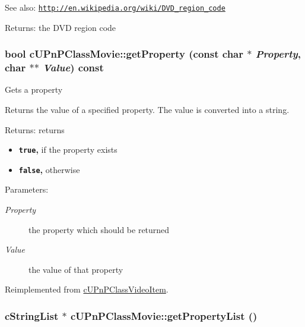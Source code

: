 \begin{Desc}
\item[See also:]\href{http://en.wikipedia.org/wiki/DVD_region_code}{\tt http://en.wikipedia.org/wiki/DVD\_\-region\_\-code} \end{Desc}
\begin{Desc}
\item[Returns:]the DVD region code \end{Desc}
\hypertarget{classcUPnPClassMovie_b4c1d5a973856469b93d2033b65d7ba2}{
\subsubsection[{getProperty}]{\setlength{\rightskip}{0pt plus 5cm}bool cUPnPClassMovie::getProperty (const char $\ast$ {\em Property}, \/  char $\ast$$\ast$ {\em Value}) const}}
\label{classcUPnPClassMovie_b4c1d5a973856469b93d2033b65d7ba2}


Gets a property

Returns the value of a specified property. The value is converted into a string.

\begin{Desc}
\item[Returns:]returns\begin{itemize}
\item {\bf {\tt true},} if the property exists\item {\bf {\tt false},} otherwise \end{itemize}
\end{Desc}
\begin{Desc}
\item[Parameters:]
\begin{description}
\item[{\em Property}]the property which should be returned \item[{\em Value}]the value of that property \end{description}
\end{Desc}


Reimplemented from \hyperlink{classcUPnPClassVideoItem_94ab2ffcbe14abb63c680e6748e70ef1}{cUPnPClassVideoItem}.\hypertarget{classcUPnPClassMovie_b62e6dac175090b82c47f955e29c146c}{
\subsubsection[{getPropertyList}]{\setlength{\rightskip}{0pt plus 5cm}cStringList $\ast$ cUPnPClassMovie::getPropertyList ()}}
\label{classcUPnPClassMovie_b62e6dac175090b82c47f955e29c146c}


